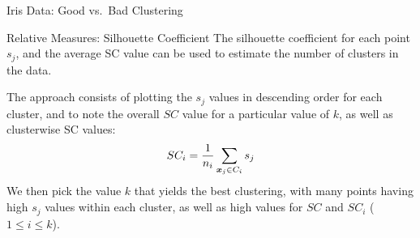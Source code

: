 \begin{frame}[fragile]{Iris Data: Good vs.\ Bad Clustering}
\setcounter{subfigure}{0}
\begin{figure}
    \centering
    \captionsetup[subfloat]{captionskip=20pt}
    \def\pshlabel#1{ {\footnotesize $#1$}}
    \def\psvlabel#1{ {\footnotesize $#1$}}
    \centerline{
	\hspace{0.4in}
	}
\end{figure}
  \begin{center}
\end{center}
\end{frame}


\ifdefined\wox \begin{frame} \titlepage \end{frame} \fi

\begin{frame}{Relative Measures: Silhouette Coeff\/{i}cient}
The silhouette coeff\/{i}cient for each
point $s_{j}$, and the average SC value
can be used to estimate the number of clusters
in the data. 

\medskip
The approach consists of plotting the $s_{j}$ values in
descending order for each cluster, and to note the overall $SC$ value
for a particular value of $k$, as well as clusterwise SC values:
\begin{align*}
  SC_i = \frac{1}{n_i}\sum_{{\boldsymbol x}_{j} \in C_i} s_{j}
\end{align*}
We then pick the value $k$ that yields the best clustering, with
many points having high $s_{j}$ values within each cluster, as well as
high values for $SC$ and $SC_i$ ($1 \le i \le k$).
\end{frame}



